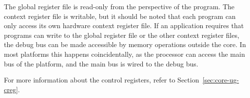 The global register file is read-only from the perspective of the program.
The context register file is writable, but it should be noted that each program
can only access its own hardware context register file. If an application
requires that programs can write to the global register file or the other
context register files, the debug bus can be made accessible by memory
operations outside the core. In most platforms this happens coincidentally,
as the processor can access the main bus of the platform, and the main bus is
wired to the debug bus.
 
For more information about the control registers, refer to
Section~\ref{sec:core-ug-creg}.
